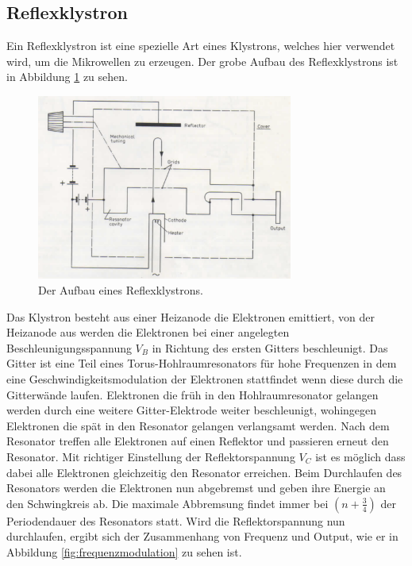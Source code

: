     \subsection{Reflexklystron}
    \label{sec:Reflexklystron}
        Ein Reflexklystron ist eine spezielle Art eines Klystrons, welches hier verwendet wird, um die Mikrowellen zu erzeugen.
        Der grobe Aufbau des Reflexklystrons ist in Abbildung \ref{fig:reflexklystron} zu sehen.
        \begin{figure}
            \centering
            \includegraphics[width = 0.75\textwidth]{bilder/Reflexklystron.png}
            \caption{Der Aufbau eines Reflexklystrons.}
            \label{fig:reflexklystron}
        \end{figure}
        Das Klystron besteht aus einer Heizanode die Elektronen emittiert, von der Heizanode aus werden die Elektronen bei einer angelegten Beschleunigungsspannung $V_B$ in Richtung des ersten Gitters beschleunigt.
        Das Gitter ist eine Teil eines Torus-Hohlraumresonators für hohe Frequenzen in dem eine Geschwindigkeitsmodulation der Elektronen stattfindet wenn diese durch die Gitterwände laufen.
        Elektronen die früh in den Hohlraumresonator gelangen werden durch eine weitere Gitter-Elektrode weiter beschleunigt, wohingegen Elektronen die spät in den Resonator gelangen verlangsamt werden. Nach dem Resonator treffen alle Elektronen auf einen Reflektor und passieren erneut den Resonator.
        Mit richtiger Einstellung der Reflektorspannung $V_C$ ist es möglich dass dabei alle Elektronen gleichzeitig den Resonator erreichen.
        Beim Durchlaufen des Resonators werden die Elektronen nun abgebremst und geben ihre Energie an den Schwingkreis ab. Die maximale Abbremsung findet immer bei $(n + \frac{3}{4})$ der Periodendauer des Resonators statt.
        Wird die Reflektorspannung nun durchlaufen, ergibt sich der Zusammenhang von Frequenz und Output, wie er in Abbildung \ref{fig:frequenzmodulation} zu sehen ist.

